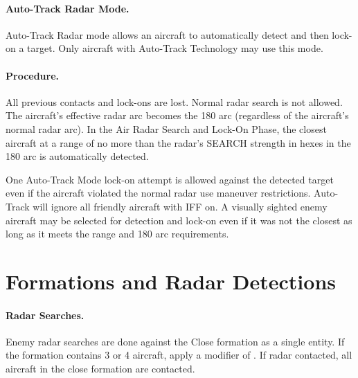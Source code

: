{\begin{advancedrules}
\paragraph{Auto-Track Radar Mode.}\label{rule:auto-track-mode} Auto-Track Radar mode allows an aircraft to automatically detect and then lock-on a target. Only aircraft with Auto-Track Technology may use this mode. 

\paragraph{Procedure.}  All previous contacts and lock-ons are lost. Normal radar search is not allowed. The aircraft's effective radar arc becomes the 180{\deg} arc (regardless of the aircraft's normal radar arc). In the Air Radar Search and Lock-On Phase, the closest aircraft at a range of no more than the radar's SEARCH strength in hexes in the 180{\deg} arc is automatically detected.

One Auto-Track Mode lock-on attempt is allowed against the detected target even if the aircraft violated the normal radar use maneuver restrictions. Auto-Track will ignore all friendly aircraft with IFF on. A visually sighted enemy aircraft may be selected for detection and lock-on  even if it was not the closest as long as it meets the range and 180{\deg} arc requirements. 


\section{Formations and Radar Detections}

\paragraph{Radar Searches.} Enemy radar searches are done against the Close formation as a single entity. If the formation contains 3 or 4 aircraft, apply a modifier of . If radar contacted, all aircraft in the close formation are contacted.


\end{advancedrules}}
